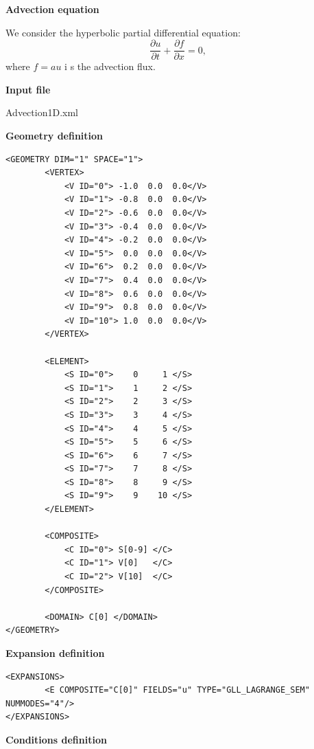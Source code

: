 \textbf{Advection equation}

We consider the hyperbolic partial differential equation:
\begin{equation}
\dfrac{\partial u}{\partial t} + \dfrac{\partial f}{\partial x} = 0,
\end{equation}
where $f =  a u$ i s the advection flux.

\textbf{Input file}

Advection1D.xml

\textbf{\footnotesize{Geometry definition}}

\begin{lstlisting}[style=XMLStyle]
<GEOMETRY DIM="1" SPACE="1">
        <VERTEX>
            <V ID="0"> -1.0  0.0  0.0</V>
            <V ID="1"> -0.8  0.0  0.0</V>
            <V ID="2"> -0.6  0.0  0.0</V>
            <V ID="3"> -0.4  0.0  0.0</V>
            <V ID="4"> -0.2  0.0  0.0</V>
            <V ID="5">  0.0  0.0  0.0</V>
            <V ID="6">  0.2  0.0  0.0</V>
            <V ID="7">  0.4  0.0  0.0</V>
            <V ID="8">  0.6  0.0  0.0</V>
            <V ID="9">  0.8  0.0  0.0</V>
            <V ID="10"> 1.0  0.0  0.0</V>
        </VERTEX> 
        
        <ELEMENT>
            <S ID="0">    0     1 </S>
            <S ID="1">    1     2 </S>
            <S ID="2">    2     3 </S>
            <S ID="3">    3     4 </S>
            <S ID="4">    4     5 </S>
            <S ID="5">    5     6 </S>
            <S ID="6">    6     7 </S>
            <S ID="7">    7     8 </S>
            <S ID="8">    8     9 </S>
            <S ID="9">    9    10 </S>
        </ELEMENT>
        
        <COMPOSITE>
            <C ID="0"> S[0-9] </C>
            <C ID="1"> V[0]   </C>
            <C ID="2"> V[10]  </C>
        </COMPOSITE>
        
        <DOMAIN> C[0] </DOMAIN>
</GEOMETRY>
\end{lstlisting}

\textbf{\footnotesize{Expansion definition}}

\begin{lstlisting}[style=XMLStyle]
<EXPANSIONS>
        <E COMPOSITE="C[0]" FIELDS="u" TYPE="GLL_LAGRANGE_SEM" NUMMODES="4"/>
</EXPANSIONS>
\end{lstlisting}

\textbf{\footnotesize{Conditions definition}}

